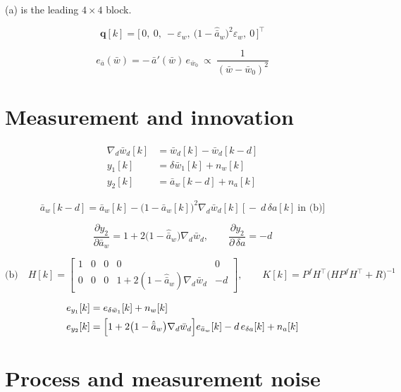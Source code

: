 \documentclass[11pt,a4paper,fontset=none]{ctexart}
\newcommand{\ba}{\bar{a}}
\newcommand{\bw}{\bar{w}}
\begin{document}
(a) is the leading $4\times 4$ block.

\begin{equation*}
\mathbf{q}[k] = \bigl[\,0,\ 0,\ -\varepsilon_w,\
\bigl(1-\hat{\ba}_w\bigr)^{2}\varepsilon_w,\ 0\,\bigr]^{\top}
\end{equation*}

\begin{equation*}
e_{\ba}(\bw) = -\,\ba'(\bw)\,e_{\bw_0}
\ \propto\ \frac{1}{(\bw-\bw_0)^{2}}
\end{equation*}

\section{Measurement and innovation}

\begin{align*}
\nabla_d\bw_d[k] &= \bw_d[k] - \bw_d[k-d] \\
y_1[k] &= \delta\bw_1[k] + n_w[k] \\
y_2[k] &= \ba_w[k-d] + n_a[k]
\end{align*}

\begin{equation*}
\ba_w[k-d] = \ba_w[k] - \bigl(1-\ba_w[k]\bigr)^{2}\nabla_d\bw_d[k]
  \ \bigl[\,-\ d\,\delta a[k]\ \text{in (b)}\bigr]
\end{equation*}

\begin{equation*}
\frac{\partial y_2}{\partial \ba_w} = 1 + 2\bigl(1-\hat{\ba}_w\bigr)\nabla_d\bw_d,
\qquad
\frac{\partial y_2}{\partial\,\delta a} = -d
\end{equation*}

\begin{equation*}
\text{(b)}\quad
H[k] =
\begin{bmatrix}
1 & 0 & 0 & 0 & 0 \\
0 & 0 & 0 & 1 + 2(1-\hat{\ba}_w)\nabla_d\bw_d & -d
\end{bmatrix},
\qquad
K[k] = P^f H^{\top}\bigl(HP^fH^{\top}+R\bigr)^{-1}
\end{equation*}

\begin{align*}
e_{y_1}[k] &= e_{\delta\bw_1}[k] + n_w[k] \\
e_{y_2}[k] &= \Bigl[1 + 2\bigl(1-\hat{\ba}_w\bigr)\nabla_d\bw_d\Bigr]
    e_{\ba_w}[k] - d\,e_{\delta a}[k] + n_a[k]
\end{align*}

\section{Process and measurement noise}
\end{document}
